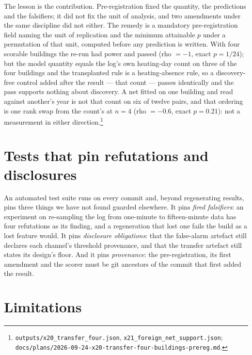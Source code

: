 \documentclass[runningheads]{llncs}
\begin{document}
The lesson is the contribution. Pre-registration fixed the quantity, the predictions and the falsifiers; it did not fix the unit of analysis, and two amendments under the same discipline did not either. The remedy is a mandatory pre-registration field naming the unit of replication and the minimum attainable $p$ under a permutation of that unit, computed before any prediction is written. With four scorable buildings the re-run had power and passed (rho $=-1$, exact $p = 1/24$); but the model quantity equals the log's own heating-day count on three of the four buildings and the transplanted rule is a heating-absence rule, so a discovery-free control added after the result --- that count --- passes identically and the pass supports nothing about discovery. A net fitted on one building and read against another's year is not that count on six of twelve pairs, and that ordering is one rank swap from the count's at $n = 4$ (rho $=-0.6$, exact $p = 0.21$): not a measurement in either direction.\footnote{\texttt{outputs/x20\_transfer\_four.json}, \texttt{x21\_foreign\_net\_support.json}; \texttt{docs/plans/2026-09-24-x20-transfer-four-buildings-prereg.md}.}

\section{Tests that pin refutations and disclosures}
\label{sec:protocol}

An automated test suite runs on every commit and, beyond regenerating results, pins three things we have not found guarded elsewhere. It pins \emph{fired falsifiers}: an experiment on re-sampling the log from one-minute to fifteen-minute data has four refutations as its finding, and a regeneration that lost one fails the build as a lost feature would. It pins \emph{disclosure obligations}: that the false-alarm artefact still declares each channel's threshold provenance, and that the transfer artefact still states its design's floor. And it pins \emph{provenance}: the pre-registration, its first amendment and the scorer must be git ancestors of the commit that first added the result.

\section{Limitations}
\label{sec:limitations}
\end{document}
